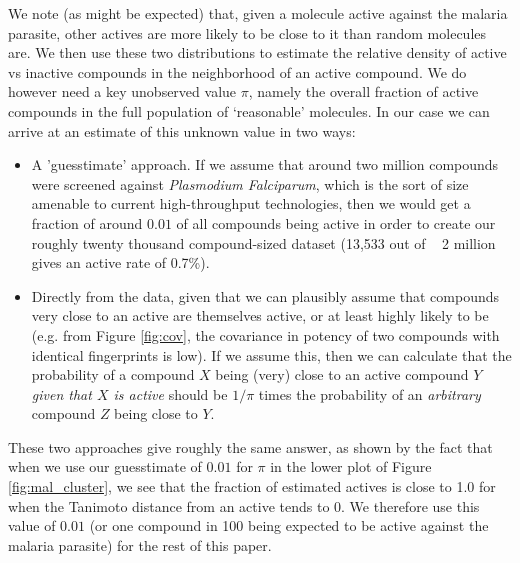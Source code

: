 \documentclass[journal=jacsat,manuscript=article]{achemso}
\begin{document}
We note (as might be expected) that, given a molecule active against the malaria parasite, other actives are more likely to be close to it than random molecules are.
\newline
\newline
We then use these two distributions to estimate the relative density of active vs inactive compounds in the neighborhood of an active compound.
We do however need a key unobserved value $\pi$, namely the overall fraction of active compounds in the full population of `reasonable' molecules.  In our case we can arrive at an estimate of this unknown value in two ways:
\begin{itemize}
    \item A 'guesstimate' approach. If we assume that around two million compounds were screened against \textit{Plasmodium Falciparum}\cite{Gamo2010}, which is the sort of size amenable to current high-throughput technologies\cite{PaweSzymanskiMagdalenaMarkowicz2012,Gamo2010}, then we would get a fraction of around $0.01$ of all compounds being active in order to create our roughly twenty thousand compound-sized dataset (13,533 out of ~ 2 million gives an active rate of 0.7\%).
    \item Directly from the data, given that we can plausibly assume that compounds very close to an active are themselves active, or at least highly likely to be (e.g. from Figure \ref{fig:cov}, the covariance in potency of two compounds with identical fingerprints is low).  If we assume this, then we can calculate that the probability of a compound $X$ being (very) close to an active compound $Y$ \textit{given that $X$ is active} should be $1/\pi$ times the probability of an \textit{arbitrary} compound $Z$ being close to $Y$.
\end{itemize}
These two approaches give roughly the same answer, as shown by the fact that when we use our guesstimate of $0.01$ for $\pi$ in the lower plot of Figure \ref{fig:mal_cluster}, we see that the fraction of estimated actives is close to 1.0 for when the Tanimoto distance from an active tends to 0.  We therefore use this value of $0.01$ (or one compound in 100 being expected to be active against the malaria parasite) for the rest of this paper. 
\end{document}
